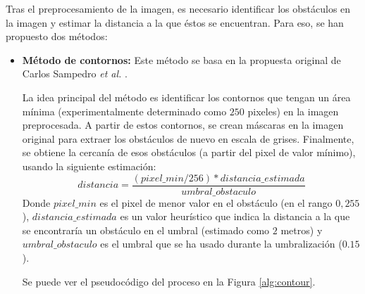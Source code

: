 Tras el preprocesamiento de la imagen, es necesario identificar los obstáculos en la imagen   y estimar la distancia a la que éstos se encuentran. Para eso, se han propuesto dos métodos:

\begin{itemize}
	\item \textbf{Método de contornos:} Este método se basa en la propuesta original de Carlos Sampedro \textit{et al.} \cite{Sampedro2018}. 
	
	La idea principal del método es identificar los contornos que tengan un área mínima (experimentalmente determinado como $250$ pixeles) en la imagen preprocesada. A partir de estos contornos, se crean máscaras en la imagen original para extraer los obstáculos de nuevo en escala de grises. Finalmente, se obtiene la cercanía de esos obstáculos (a partir del pixel de valor mínimo), usando la siguiente estimación:
	\[distancia = \frac{(pixel\_min / 256) * distancia\_estimada}{umbral\_obstaculo}\]
Donde $pixel\_min$ es el pixel de menor valor en el obstáculo (en el rango ${0, 255}$), $distancia\_estimada$ es un valor heurístico que indica la distancia a la que se encontraría un obstáculo en el umbral (estimado como $2$ metros) y $umbral\_obstaculo$ es el umbral que se ha usado durante la umbralización ($0.15$).

Se puede ver el pseudocódigo del proceso en la Figura \ref{alg:contour}.


\end{itemize}
